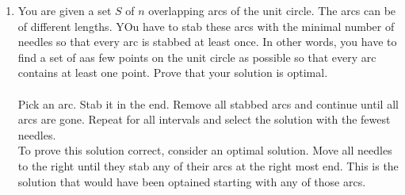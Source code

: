 \documentclass[a4paper]{article}
\begin{document}
\begin{enumerate}
		\item You are given a set $S$ of $n$ overlapping arcs of the unit circle. The arcs can be of different lengths. YOu have to stab these arcs with the minimal number of needles so that every arc is stabbed at least once. In other words, you have to find a set of aas few points on the unit circle as possible so that every arc contains at least one point. Prove that your solution is optimal. \\ \\
				Pick an arc. Stab it in the end. Remove all stabbed arcs and continue until all arcs are gone. Repeat for all intervals and select the solution with the fewest needles. \\
				To prove this solution correct, consider an optimal solution. Move all needles to the right until they stab any of their arcs at the right most end. This is the solution that would have been optained starting with any of those arcs.


\end{enumerate}
\end{document}
